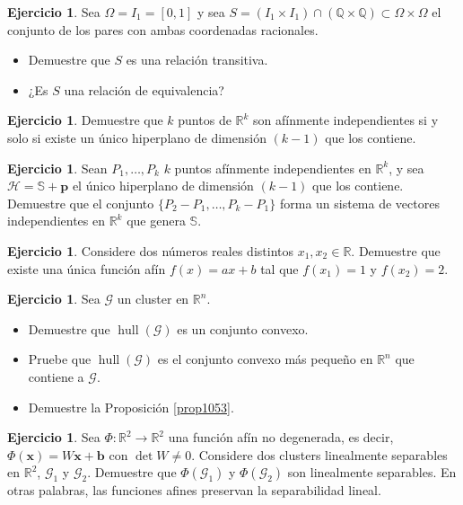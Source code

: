 \documentclass[12pt, a4paper]{amsbook}
\def\hull{\operatorname {\mathrm{hull}}}
\newcommand{\R}{{\mathbb R}}
\newcommand{\Q}{{\mathbb Q}}
\newcommand{\Sb}{{\mathbb S}}
\newcommand{\Hc}{{\mathcal H}}
\newcommand{\G}{{\mathcal G}}
\newcommand{\pp}{{\mathbf p}}
\newcommand{\xx}{{\mathbf x}}
\newcommand{\bb}{{\mathbf b}}
\theoremstyle{remark}
\theoremstyle{definition}
\newtheorem{ejer}[teo]{Ejercicio}
\numberwithin{section}{chapter}
\numberwithin{subsection}{section}
\numberwithin{equation}{section}
\numberwithin{figure}{chapter}
\begin{document}
\begin{ejer}
Sea $\Omega=I_1=[0,1]$ y sea $S = (I_1 \times I_1) \cap (\Q \times \Q)\subset\Omega\times\Omega$ el conjunto de los pares con ambas coordenadas racionales.
\begin{itemize}
\item[(a)] Demuestre que $S$ es una relación transitiva.
\item[(b)] ¿Es $S$ una relación de equivalencia?
\end{itemize}
\end{ejer}

\begin{ejer} \label{18.11.3}
Demuestre que $k$ puntos de $\R^k$ son afínmente independientes si y solo si existe un único hiperplano de dimensión $(k-1)$ que los contiene.
\end{ejer}

\begin{ejer}
Sean $P_1, \dots, P_k$ $k$ puntos afínmente independientes en $\R^k$, y sea $\Hc=\Sb+\pp$ el único hiperplano de dimensión $(k-1)$ que los contiene. Demuestre que el conjunto $\{ P_2-P_1, \dots, P_k-P_1\}$ forma un sistema de vectores independientes en $\R^k$ que genera $\Sb$.
\end{ejer}

\begin{ejer}
Considere dos números reales distintos $x_1, x_2 \in \R$. Demuestre que existe una única función afín $f(x) = ax + b$ tal que $f(x_1) = 1$ y $f(x_2) = 2$.
\end{ejer}

\begin{ejer} \label{18.11.5}
Sea $\G$ un cluster en $\R^n$.
\begin{itemize}
\item[(a)] Demuestre que $\hull(\G)$ es un conjunto convexo.
\item[(b)] Pruebe que $\hull(\G)$ es el conjunto convexo más pequeño en $\R^n$ que contiene a $\G$.
\item[(c)] Demuestre la Proposición \ref{prop1053}.
\end{itemize}
\end{ejer}

\begin{ejer}
Sea $\Phi\colon \R^2 \to \R^2$ una función afín no degenerada, es decir, $\Phi(\xx) = W\xx + \bb$ con $\det W \neq 0$. Considere dos clusters linealmente separables en $\R^2$, $\G_1$ y $\G_2$. Demuestre que $\Phi(\G_1)$ y $\Phi(\G_2)$ son linealmente separables. En otras palabras, las funciones afines preservan la separabilidad lineal.
\end{ejer}
\end{document}
